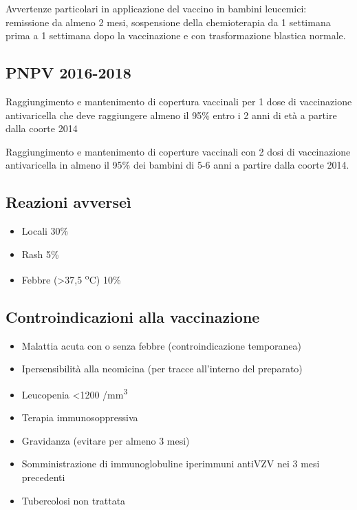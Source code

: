 Avvertenze particolari in applicazione del vaccino in bambini leucemici:
remissione da almeno 2 mesi, sospensione della chemioterapia da 1
settimana prima a 1 settimana dopo la vaccinazione e con trasformazione
blastica normale.

\subsection{PNPV 2016-2018}

Raggiungimento e mantenimento di copertura vaccinali per 1 dose di
vaccinazione antivaricella che deve raggiungere almeno il 95\% entro i 2
anni di età a partire dalla coorte 2014

Raggiungimento e mantenimento di coperture vaccinali con 2 dosi di
vaccinazione antivaricella in almeno il 95\% dei bambini di 5-6 anni a
partire dalla coorte 2014.

\subsection{Reazioni avverseì}

\begin{itemize}
\item
  Locali 30\%
\item
  Rash 5\%
\item
  Febbre (\textgreater{}37,5 \textsuperscript{o}C) 10\%
\end{itemize}

\subsection{Controindicazioni alla vaccinazione}

\begin{itemize}
\item
  Malattia acuta con o senza febbre (controindicazione temporanea)
\item
  Ipersensibilità alla neomicina (per tracce all'interno del preparato)
\item
  Leucopenia \textless{}1200 /mm\textsuperscript{3}
\item
  Terapia immunosoppressiva
\item
  Gravidanza (evitare per almeno 3 mesi)
\item
  Somministrazione di immunoglobuline iperimmuni antiVZV nei 3 mesi
  precedenti
\item
  Tubercolosi non trattata
\end{itemize}

